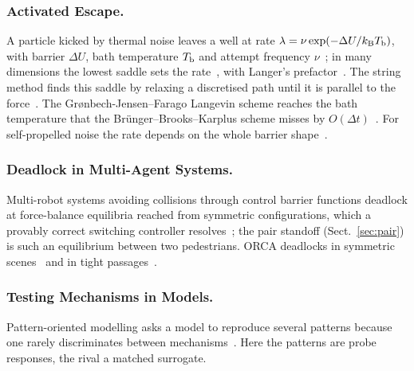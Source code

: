 \subsubsection{Activated Escape.}
A particle kicked by thermal noise leaves a well at rate $\lambda=\nu\exp(-\Delta U/k_{\rm B}T_{\rm b})$, with barrier $\Delta U$, bath temperature $T_{\rm b}$ and attempt frequency $\nu$~\cite{kramers1940}; in many dimensions the lowest saddle sets the rate~\cite{hanggi1990}, with Langer's prefactor~\cite{langer1969}. The string method finds this saddle by relaxing a discretised path until it is parallel to the force~\cite{e2002,e2007}. The Gr{\o}nbech-Jensen--Farago Langevin scheme reaches the bath temperature that the Br{\"u}nger--Brooks--Karplus scheme misses by $O(\Delta t)$~\cite{gronbechjensen2013}. For self-propelled noise the rate depends on the whole barrier shape~\cite{woillez2019}.

\subsubsection{Deadlock in Multi-Agent Systems.}
Multi-robot systems avoiding collisions through control barrier functions deadlock at force-balance equilibria reached from symmetric configurations, which a provably correct switching controller resolves~\cite{grover2023,grover2020}; the pair standoff (Sect.~\ref{sec:pair}) is such an equilibrium between two pedestrians. ORCA deadlocks in symmetric scenes~\cite{liu2026orcadeadlock} and in tight passages~\cite{dergachev2021case}.

\subsubsection{Testing Mechanisms in Models.}
Pattern-oriented modelling asks a model to reproduce several patterns because one rarely discriminates between mechanisms~\cite{grimm2005}. Here the patterns are probe responses, the rival a matched surrogate.
